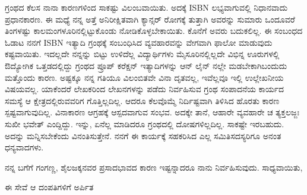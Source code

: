 {ಗ್ರಂಥದ ಕೆಲಸ ನಾನಾ ಕಾರಣಗಳಿಂದ ಸಾಕಷ್ಟು ವಿಲಂಬವಾಯಿತು. ಅದಕ್ಕೆ ISBN ಲಭ್ಯವಾಗುವಲ್ಲಿ ನಿಧಾನವಾದು ಪ್ರಧಾನಕಾರಣ. ಈ ಮಧ್ಯೆ ನನ್ನ ಅತ್ತೆ ಅನಿರೀಕ್ಷಿತವಾಗಿ ಕ್ಯಾನ್ಸರ್ ರೋಗಕ್ಕೆ ತುತ್ತಾಗಿ ಅವರನ್ನು ಸುಮಾರು ಒಂದೂವರೆ ತಿಂಗಳಷ್ಟು ಕಾಲ\break ಮಂಗಳೂರಿನಲ್ಲಿಟ್ಟುಕೊಂಡು ನೋಡಿಕೊಳ್ಳಬೇಕಾಯಿತು. ಕೊನೆಗೆ ಅವರು ಬದುಕಲಿಲ್ಲ. ಈ ಸಂಬಂಧದ ಓಡಾಟ ನನಗೆ ISBN ಇತ್ಯಾದಿ ಗ್ರಂಥಕ್ಕೆ ಸಂಬಂಧಿಸಿದ ವ್ಯವಹಾರವನ್ನು ವೇಗವಾಗಿ ಫಾಲೋ ಮಾಡುವುದು ಕಷ್ಟವಾಯಿತು. ಇದಲ್ಲದೇ ನನ್ನನ್ನು ಬಿಟ್ಟು ಉಳಿ\-ದೆಲ್ಲ ವಿದ್ಯಾರ್ಥಿಗಳು ಮೈಸೂರಿನಲ್ಲಿಲ್ಲದೇ ವಿಭಿನ್ನ ಊರುಗಳಲ್ಲಿ ಔದ್ಯೋಗಿಕ ಒತ್ತಡ\-ದಲ್ಲಿದ್ದು ಗ್ರಂಥದ ಪ್ರೂಪ್ ಕರೆಕ್ಷನ್ ಇತ್ಯಾದಿಗಳನ್ನು ಆನ್ ಲೈನ್ ನಲ್ಲೇ ಮಡಬೇಕಾಗಿ\break ಬಂದುದು ಮತ್ತೊಂದು ಕಾರಣ. ಅಷ್ಟಕ್ಕೂ ನನ್ನ ಗತಿಯೂ ವಿಲಂಬಿತವೇ ವಿನಾ ದೃತ\-ವಲ್ಲ, ಇವೆಲ್ಲವೂ ಇಲ್ಲಿ ಉಲ್ಲೇಖನೀಯ ವಿಷಯವಲ್ಲ. ಯಾಕೆಂದರೆ ಲೇಖಕರಿಂದ ಲೇಖನಗಳನ್ನು ಪಡೆದು ನಿರ್ವಹಿಸುವ ಗ್ರಂಥ ಸಂಪಾದನೆಯ ಕಾರ್ಯದ ಸಮಸ್ಯೆ ಆ ಕ್ಷೇತ್ರದಲ್ಲಿರುವವರಿಗ ಗೊತ್ತಿಲ್ಲದಿಲ್ಲ. ಆದರೂ ಕೆಲವೊಮ್ಮೆ ನಿರ್ದಿಷ್ಟವಾಗಿ ತಿಳಿಸಿದ ಹೊರತು ಕಾರಣ ಸ್ಪಷ್ಟವಾಗುವುದಿಲ್ಲ. ವಿನಾಕಾರಣ ಆಗ್ರಹಕ್ಕೆ ಆಸ್ಪದವಾಗುವ ಸಂಭವ. ಅದಕ್ಕೇ ತಾನೆ, ಆಹಾರೇ ವ್ಯವಹಾರೇ ಚ ತ್ಯಕ್ತಲಜ್ಜಃ ಸುಖೀ ಭವೇತ್ ಎಂದ್ದಿದ್ದು. ಇನ್ನು, ಏನೆಲ್ಲ ಮಾಡಿದರೂ ಗ್ರಂಥದಲ್ಲಿ ದೋಷಗಳಿಲ್ಲದಿಲ್ಲ. ಸಾಕಷ್ಟೇ ಇರಬಹುದು. ಅದನ್ನು ಮನ್ನಿಸಬೇಕೆಂದು ವಿನಂತಿಸುತ್ತೇನೆ. ನನಗೆ ಈ ಕಾರ್ಯಕ್ಕೆ ಸಹಕರಿಸಿದ ಎಲ್ಲ ಸಮಿತಿ\break ಸದಸ್ಯರಿಗೂ ಅನಂತ ಧನ್ಯವಾದಗಳು.

ನನ್ನ ಬಗೆಗೆ ಗಂಗಣ್ಣ, ಶೈಲಜಕ್ಕನವರ ಪ್ರಸಾದಭಾವದ ಕಾರಣ ಇಷ್ಟನ್ನಾದರೂ ನಾನು ನಿರ್ವಹಿಸುವುದು. ಸಾಧ್ಯವಾಯಿತು,

ಈ ಸೇವೆ ಆ ದಂಪತಿಗಳಿಗೆ ಅರ್ಪಿತ

\articleend
}
